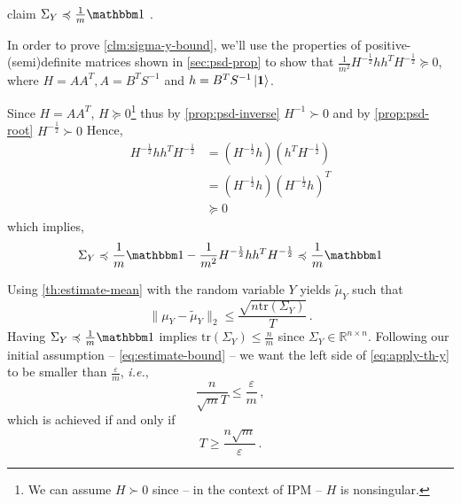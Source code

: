 \begin{theoremEnd}{claim}\label{clm:sigma-y-bound}
    $\Sigma_Y \preccurlyeq \frac 1 m \mathbbm 1$ .
\end{theoremEnd}
\begin{proofEnd}
In order to prove \autoref{clm:sigma-y-bound}, we'll use the properties of
positive-(semi)definite matrices shown in \autoref{sec:psd-prop} to show that
$\frac{1}{m^2} H^{-\frac 1 2} h h^T H^{-\frac 1 2} \succcurlyeq 0$, where $H = A
A^T, A = B^TS^{-1}$ and $h = B^TS^{-1}\ket{\boldsymbol 1}$.

Since $H = A A^T$, $H \succcurlyeq 0$\footnote{We can assume $H \succ 0$ since --
in the context of IPM -- $H$ is nonsingular.} thus by
\autoref{prop:psd-inverse} $H^{-1} \succ 0$ and by \autoref{prop:psd-root}
$H^{-\frac{1}{2}} \succ 0$ Hence,
\begin{equation*}
\begin{aligned}
 H^{-\frac{1}{2}} h h^T H^{-\frac{1}{2}}
    & = (H^{-\frac{1}{2}}h)(h^TH^{-\frac{1}{2}}) \\
    & = (H^{-\frac{1}{2}}h)(H^{-\frac{1}{2}}h)^T \\
    & \succcurlyeq 0
\end{aligned}
\end{equation*}
which implies,
    $$ \Sigma_Y \preccurlyeq \frac 1 m \mathbbm 1 - \frac{1}{m^2} H^{-\frac 1 2} h h^T H^{-\frac 1 2} \preccurlyeq \displaystyle\frac 1 m \mathbbm 1$$
\end{proofEnd}
Using \autoref{th:estimate-mean} with the random variable $Y$ yields $\tilde \mu_Y$ such
that
\begin{equation}\label{eq:apply-th-y}
\| \mu_Y - \tilde \mu_Y\|_2 \leq \frac{\sqrt{n \text{tr}(\Sigma_Y)}}{T} \, .
\end{equation}
Having $\Sigma_Y  \preccurlyeq \frac 1 m \mathbbm 1$ implies
$\text{tr}(\Sigma_Y) \leq \frac{n}{m}$ since $\Sigma_Y \in \mathbb R^{n \times
n}$. Following our initial assumption -- \autoref{eq:estimate-bound} -- we want
the left side of \autoref{eq:apply-th-y} to be smaller than $\frac \varepsilon
m$, \emph{i.e.},
\begin{equation*}
    \frac{n}{\sqrt m T} \leq \frac \varepsilon m \, ,
\end{equation*}
which is achieved if and only if
\begin{equation*}
    T \geq \frac{n \sqrt m}{\varepsilon} \, .
\end{equation*}


